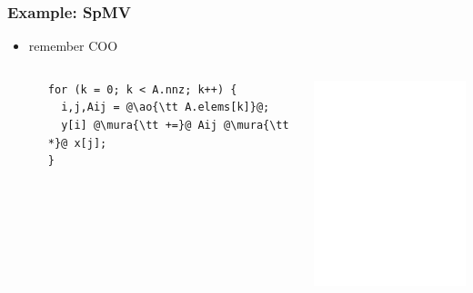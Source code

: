 \documentclass[12pt,dvipdfmx]{beamer}
\newcommand{\mura}[1]{{\color{purple}#1}}
\newcommand{\ao}[1]{{\color{blue}#1}}
\begin{document}
\begin{frame}[fragile]
\frametitle{Example: SpMV}
\begin{itemize}
\item<1-> remember COO
  \begin{columns}
    \begin{column}{0.05\textwidth}
    \end{column}
    \begin{column}{0.5\textwidth}
\begin{lstlisting}
for (k = 0; k < A.nnz; k++) {
  i,j,Aij = @\ao{\tt A.elems[k]}@;
  y[i] @\mura{\tt +=}@ Aij @\mura{\tt *}@ x[j];
}
\end{lstlisting}
    \end{column}
    \begin{column}{0.3\textwidth}
\includegraphics[width=\textwidth]{out/pdf/svg/spmv.pdf}
    \end{column}
  \end{columns}


\end{itemize}
\end{frame}
\end{document}
